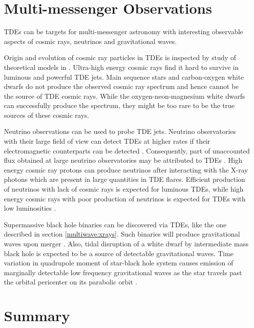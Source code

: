 \documentclass{tda}
\begin{document}
\section{Multi-messenger Observations} \label{multimessenger_astro}

TDEs can be targets for multi-messenger astronomy with interesting observable aspects of cosmic rays, neutrinos and gravitational waves.

Origin and evolution of cosmic ray particles in TDEs is inspected by study of theoretical models in \cite{zhang_high-energy_2017}. Ultra-high energy cosmic rays find it hard to survive in luminous and powerful TDE jets. Main sequence stars and carbon-oxygen white dwarfs do not produce the observed cosmic ray spectrum and hence cannot be the source of TDE cosmic rays. While the oxygen-neon-magnesium white dwarfs can successfully produce the spectrum, they might be too rare to be the true sources of these cosmic rays.

Neutrino observations can be used to probe TDE jets. Neutrino observatories with their large field of view can detect TDEs at higher rates if their electromagnetic counterparts can be detected \cite{wang_probing_2011}. Consequently, part of unaccounted flux obtained at large neutrino observatories may be attributed to TDEs \cite{lunardini_high_2017}. High energy cosmic ray protons can produce neutrinos after interacting with the X-ray photons which are present in large quantities in TDE flares. Efficient production of neutrinos with lack of cosmic rays is expected for luminous TDEs, while high energy cosmic rays with poor production of neutrinos is expected for TDEs with low luminosities \cite{zhang_high-energy_2017}. 

Supermassive black hole binaries can be discovered via TDEs, like the one described in section \ref{multiwave:xrays}. Such binaries will produce gravitational waves upon merger \cite{komossa_tidal_2015}. Also, tidal disruption of a white dwarf by intermediate mass black hole is expected to be a source of detectable gravitational waves. Time variation in quadrupole moment of star-black hole system causes emission of marginally detectable low frequency gravitational waves as the star travels past the orbital pericenter on its parabolic orbit \cite{kobayashi_gravitational_2004, nicholas_chamberlain_stone_tidal_2013}.  

\section{Summary} \label{summary}
\end{document}
